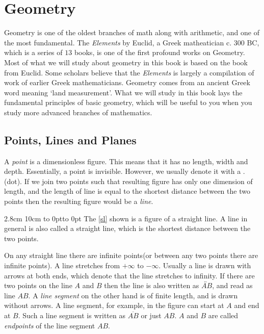 \chapter{Geometry}

%


\color{black}Geometry is one of the oldest branches of math along with arithmetic, and one of the most
fundamental. The {\it Elements} by Euclid, a Greek matheatician c. $300$ BC, which is a series of $13$
books, is one of the first profound works on Geometry. Most of what we will study about geometry in this
book is based on the book from Euclid. Some scholars believe that the {\it Elements} is
largely a compilation of work of earlier Greek mathematicians. Geometry comes from an ancient Greek word
meaning `land measurement'. What we will study in this book lays the fundamental principles of basic
geometry, which will be useful to you when you study more advanced branches of mathematics.

\section{Points, Lines and Planes}

%

\noindent A {\it point} is a dimensionless figure. This means that it has no length, width and depth. Essentially, a
point is invisible. However, we usually denote it with a .(dot). If we join two points such that resulting
figure has only one dimension of length, and the length of line is equal to the shortest distance between
the two points then the resulting figure would be a {\it line}.

2.8cm 10cm
\hbox to 0pt{\vbox to 0pt{%
\vss}\hss}
\indent The \ref{sl} shown is a figure of a straight line. A line in general is also called a straight line,
which is the shortest distance between the two points.

On any straight line there are infinite points(or between any two points there are infinite points). A line
stretches from $+\infty$ to $-\infty$. Usually a line
is drawn with arrows at both ends, which denote that the line stretches to infinity. If there are two points
on the line $A$ and $B$ then the line is also written as $\overleftrightarrow{AB}$, and read as line $AB$. A
{\it line segment} on the other hand is of finite length, and is drawn without arrows. A line segment, for
example, in the figure can start at $A$ and end at $B$. Such a line segment is written as $\overline{AB}$ or
just $AB$. $A$ and $B$ are called {\it endpoints} of the line segment $AB$.


